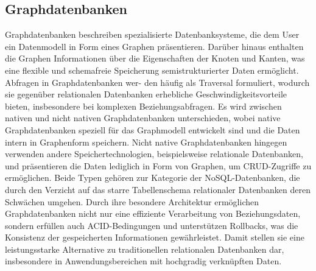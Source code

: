 \subsection{Graphdatenbanken} %
\label{sec:graphDatenbanken}
Graphdatenbanken beschreiben spezialisierte Datenbanksysteme, die dem User ein Datenmodell in Form eines Graphen präsentieren. Darüber hinaus enthalten die Graphen Informationen über die Eigenschaften der Knoten und Kanten, was eine flexible und schemafreie Speicherung semistrukturierter Daten ermöglicht. Abfragen in Graphdatenbanken wer- den häufig als Traversal formuliert, wodurch sie gegenüber relationalen Datenbanken erhebliche Geschwindigkeitsvorteile bieten, insbesondere bei komplexen Beziehungsabfragen. Es wird zwischen nativen und nicht nativen Graphdatenbanken unterschieden, wobei native Graphdatenbanken speziell für das Graphmodell entwickelt sind und die Daten intern in Graphenform speichern. Nicht native Graphdatenbanken hingegen verwenden andere Speichertechnologien, beispielsweise relationale Datenbanken, und präsentieren die Daten lediglich in Form von Graphen, um CRUD-Zugriffe zu ermöglichen. Beide Typen gehören zur Kategorie der NoSQL-Datenbanken, die durch den Verzicht auf das starre Tabellenschema relationaler Datenbanken deren Schwächen umgehen. Durch ihre besondere Architektur ermöglichen Graphdatenbanken nicht nur eine effiziente Verarbeitung von Beziehungsdaten, sondern erfüllen auch ACID-Bedingungen und unterstützen Rollbacks, was die Konsistenz der gespeicherten Informationen gewährleistet. Damit stellen sie eine leistungsstarke Alternative zu traditionellen relationalen Datenbanken dar, insbesondere in Anwendungsbereichen mit hochgradig verknüpften Daten. 
\citep{9677042} \citep{graphdb} 

